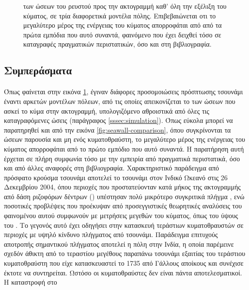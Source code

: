 \begin{figure}[]
\begin{subfigure}{\textwidth}
  \end{subfigure}
  \caption[ ώσεων στην ακτογραμμή]{ των ώσεων του ρευστού προς
    την ακτογραμμή καθ' όλη την εξέλιξη του κύματος, σε τρία διαφορετικά μοντέλα
    πόλης. Επιβεβαιώνεται οτι το μεγαλύτερο μέρος της ενέργειας του κύματος απορροφάται
    από από τα πρώτα εμπόδια που αυτό συναντά, φαινόμενο που έχει δειχθεί τόσο σε
    καταγραφές πραγματικών περιστατικών, όσο και στη βιβλιογραφία.}
  \label{fig:impulse-fields}
\end{figure}

\subsection{Συμπεράσματα}
\paragraph{} Όπως φαίνεται στην εικόνα \ref{fig:impulse-fields}, έγιναν διάφορες
προσομοιώσεις πρόσπτωσης τσουνάμι έναντι αρκετών μοντέλων πόλεων, από τις οποίες
απεικονίζεται το  των ώσεων που ασκεί το κύμα στην ακτογραμμή, υπολογιζόμενο
αθροιστικά από όλες τις καταγραφόμενες ώσεις (παράγραφος \ref{sssec:simulation}). Όπως
εύκολα μπορεί να παρατηρηθεί και από την εικόνα \ref{fig:seawall-comparison}, όπου
συγκρίνονται τα  ώσεων παρουσία και μη ενός κυματοθραύστη, το μεγαλύτερο
μέρος της ενέργειας του κύματος απορροφάται από το πρώτο εμπόδιο που αυτό συναντά. Η
παρατήρηση αυτή έρχεται σε πλήρη συμφωνία τόσο με την εμπειρία από πραγματικά περιστατικά,
όσο και από άλλες αναφορές στη βιβλιογραφία. Χαρακτηριστικό παράδειγμα από πρόσφατο
κρούσμα τσουνάμι αποτελεί το τσουνάμι στον Ινδικό Ωκεανό στις 26 Δεκεμβρίου 2004, όπου
περιοχές που προστατεύονταν κατά μήκος της ακτογραμμής από δάση ριζοφόρων δέντρων
() υπέστησαν πολύ μικρότερο συγκριτικά πλήγμα \cite{danielsen2005asian,
  kathiresan2005601}, ενώ ποσοτικές προβλέψεις που προέκυψαν από προσεγγιστικές θεωρητικές
αναλύσεις του φαινομένου αυτού συμφωνούν με μετρήσεις μεγεθών του κύματος, όπως του ύψους
του \cite{yanagisawa200927}. Το γεγονός αυτό έχει οδηγήσει στην κατασκευή τεράστιων
κυματοθραυστών σε περιοχές με υψηλό κίνδυνο πλήγματος από τσουνάμι. Παράδειγμα επιτυχούς
αποτροπής σημαντικού πλήγματος αποτελεί η πόλη  στην Ινδία, η οποία
παρέμεινε σχεδόν άθικτη από το τεραστίου μεγέθους παραπάνω τσουνάμι εξαιτίας του τεράστιου
κυματοθραύστη που είχε κατασκευαστεί το 1735 από Γάλλους αποίκους και συνέχισε έκτοτε να
συντηρείται. Ωστόσο οι κυματοθραύστες δεν είναι πάντα αποτελεσματικοί. Η καταστροφή στο
